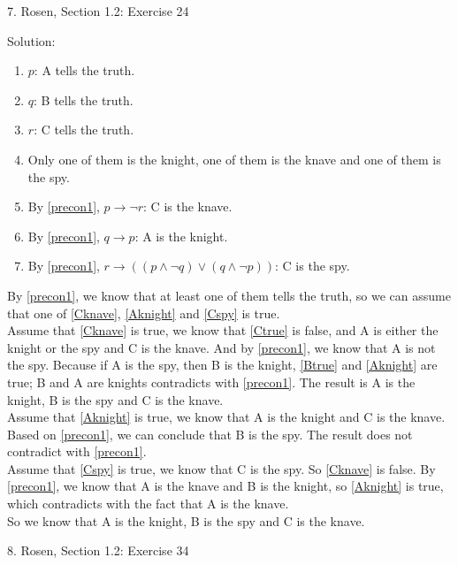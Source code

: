 \documentclass[12pt]{article}
\begin{document}
7. Rosen, Section 1.2: Exercise 24

\indent Solution:\\
\begin{enumerate}
\item \label{Atrue} $p$: A tells the truth.
\item \label{Btrue} $q$: B tells the truth.
\item \label{Ctrue} $r$: C tells the truth.
\item \label{precon1} Only one of them is the knight, one of them is the knave and one of them is the spy.
\item \label{Cknave} By \ref{precon1}, $p \to \lnot r$: C is the knave.
\item \label{Aknight} By \ref{precon1}, $q \to p$: A is the knight.
\item \label{Cspy} By \ref{precon1}, $r \to ((p \land \lnot q) \lor (q \land \lnot p))$: C is the spy.
\end{enumerate}

By \ref{precon1}, we know that at least one of them tells the truth, so we can assume that one of \ref{Cknave}, \ref{Aknight} and \ref{Cspy} is true.\\
\indent Assume that \ref{Cknave} is true, we know that \ref{Ctrue} is false, and A is either the knight or the spy and C is the knave. And by \ref{precon1}, we know that A is not the spy. Because if A is the spy, then B is the knight, \ref{Btrue} and \ref{Aknight} are true; B and A are knights contradicts with \ref{precon1}. The result is A is the knight, B is the spy and C is the knave.\\ 
\indent Assume that \ref{Aknight} is true, we know that A is the knight and C is the knave. Based on \ref{precon1}, we can conclude that B is the spy. The result does not contradict with \ref{precon1}.\\
\indent Assume that \ref{Cspy} is true, we know that C is the spy. So \ref{Cknave} is false. By \ref{precon1}, we know that A is the knave and B is the knight, so \ref{Aknight} is true, which contradicts with the fact that A is the knave.\\
\indent So we know that A is the knight, B is the spy and C is the knave.
\newpage

8. Rosen, Section 1.2: Exercise 34
\end{document}
